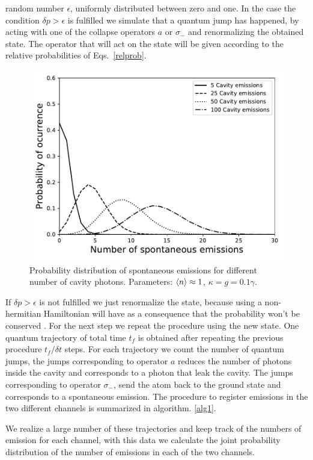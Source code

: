 \documentclass[%
 reprint,
 amsmath,amssymb,
 aps, 
]{revtex4-1}
\begin{document}
random number $\epsilon$, uniformly distributed between zero and one.
In the case the condition $\delta p > \epsilon$ is fulfilled we
simulate that a quantum jump has happened, by acting with one of the
collapse operators $a$ or $\sigma_-$ and renormalizing the obtained
state. The operator that will act on the state will be given according
to the relative probabilities of Eqs.~\eqref{relprob}.
\begin{figure}[!t] 
\centering
\includegraphics[scale = 0.5]{distributioneng.pdf}
\caption{Probability distribution of spontaneous emissions for
  different number of cavity photons. Parameters: $\expval{n} \approx 1$, $\kappa = g = 0.1\gamma$. } \label{probdiss}
\end{figure}
If $\delta p > \epsilon$ is not fulfilled we just renormalize the
state, because using a non-hermitian Hamiltonian will have as a
consequence that the probability won't be conserved
\cite{Sakurai:1167961}. For the next step we repeat the procedure
using the new state. One quantum trajectory of total time $t_f$ is
obtained after repeating the previous procedure $t_f/\delta t$ steps.
For each trajectory we count the number of quantum jumps, the jumps
corresponding to operator $a$ reduces the number of photons inside the
cavity and corresponds to a photon that leak the cavity. The jumps
corresponding to operator $\sigma_-$, send the atom back to the ground
state and corresponds to a spontaneous emission. The procedure to
register emissions in the two different channels is summarized in
algorithm. \ref{alg1}.

We realize a large number of these trajectories and keep track of the
numbers of emission for each channel, with this data we calculate
the joint probability distribution of the number of emissions in each
of the two channels.
\end{document}
